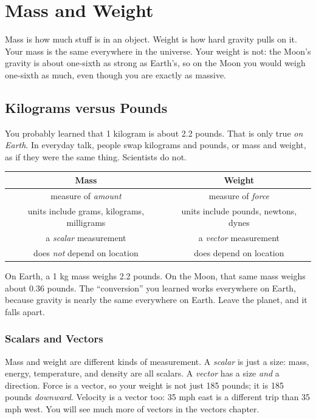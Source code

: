 \chapter{Mass and Weight}
Mass is how much stuff is in an object. Weight is how hard gravity pulls on it. Your mass is the same everywhere in the universe. Your weight is not: the Moon's gravity is about one-sixth as strong as Earth's, so on the Moon you would weigh one-sixth as much, even though you are exactly as massive.

\section{Kilograms versus Pounds}
You probably learned that 1 kilogram is about 2.2 pounds. That is only true \textit{on Earth}. In everyday talk, people swap kilograms and pounds, or mass and weight, as if they were the same thing. Scientists do not.

\begin{tabular}{|c|c|}\hline
  \textbf{Mass}                              & \textbf{Weight}                      \\\hline
  measure of \textit{amount}                 & measure of \textit{force}            \\\hline
  units include grams, kilograms, milligrams & units include pounds, newtons, dynes \\\hline
  a \textit{scalar} measurement              & a \textit{vector} measurement        \\\hline
  does \textit{not} depend on location       & does depend on location              \\\hline
\end{tabular}

On Earth, a 1 kg mass weighs 2.2 pounds. On the Moon, that same mass weighs about 0.36 pounds. The ``conversion'' you learned works everywhere on Earth, because gravity is nearly the same everywhere on Earth. Leave the planet, and it falls apart.

\subsection{Scalars and Vectors}
Mass and weight are different kinds of measurement. A \textit{scalar} is just a size: mass, energy, temperature, and density are all scalars. A \textit{vector} has a size \emph{and} a direction. Force is a vector, so your weight is not just 185 pounds; it is 185 pounds \textit{downward}. Velocity is a vector too: 35 mph east is a different trip than 35 mph west. You will see much more of vectors in the vectors chapter.

